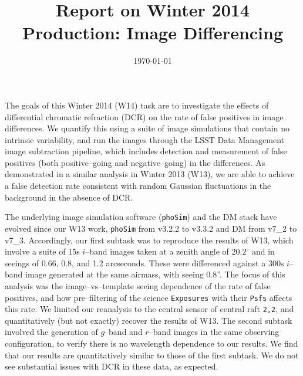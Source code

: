 \documentclass[prd, nofootinbib, floatfix, 11pt, tightenlines, times]{article}
\title{\vspace{-22mm} \Large{Report on Winter 2014 Production: Image Differencing}}
\date{\today}
\author{
}
\begin{document}
\maketitle\vspace{-8mm}

The goals of this Winter 2014 (W14) task are to investigate the
effects of differential chromatic refraction (DCR) on the rate of
false positives in image differences.  We quantify this using a suite
of image simulations that contain no intrinsic variability, and run
the images through the LSST Data Management image subtraction
pipeline, which includes detection and measurement of false positives
(both positive--going and negative--going) in the differences.  As
demonstrated in a similar analysis in Winter 2013 (W13), we are able
to achieve a false detection rate consistent with random Gaussian
fluctuations in the background in the absence of DCR.

The underlying image simulation software ({\tt phoSim}) and the DM
stack have evolved since our W13 work, {\tt phoSim} from v3.2.2 to
v3.3.2 and DM from v7\_2 to v7\_3.  Accordingly, our first subtask was
to reproduce the results of W13, which involve a suite of 15s
$i$--band images taken at a zenith angle of $20.2^{\circ}$ and in
seeings of 0.66, 0.8, and 1.2 arcseconds.  These were differenced
against a 300s $i$--band image generated at the same airmass, with
seeing 0.8''.  The focus of this analysis was the image--vs--template
seeing dependence of the rate of false positives, and how
pre--filtering of the science {\tt Exposures} with their {\tt Psfs}
affects this rate.  We limited our reanalysis to the central sensor of
central raft {\tt 2,2}, and quantitatively (but not exactly) recover
the results of W13.  The second subtask involved the generation of
$g$--band and $r$--band images in the same observing configuration, to
verify there is no wavelength dependence to our results.  We find that
our results are quantitatively similar to those of the first subtask.
We do not see substantial issues with DCR in these data, as expected.
\end{document}
